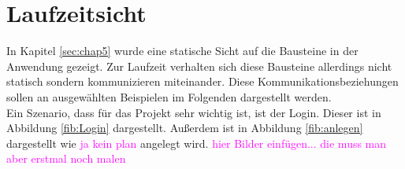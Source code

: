 \chapter{Laufzeitsicht}
In Kapitel \ref{sec:chap5} wurde eine statische Sicht auf die Bausteine in der Anwendung gezeigt. Zur Laufzeit verhalten sich diese Bausteine allerdings nicht statisch sondern kommunizieren miteinander. Diese Kommunikationsbeziehungen sollen an ausgewählten Beispielen im Folgenden dargestellt werden.\\
Ein Szenario, dass für das Projekt sehr wichtig ist, ist der Login. Dieser ist in Abbildung \ref{fib:Login} dargestellt. 
Außerdem ist in Abbildung \ref{fib:anlegen} dargestellt wie \textcolor{magenta}{ja kein plan} angelegt wird.
\textcolor{magenta}{hier Bilder einfügen... die muss man aber erstmal noch malen}
